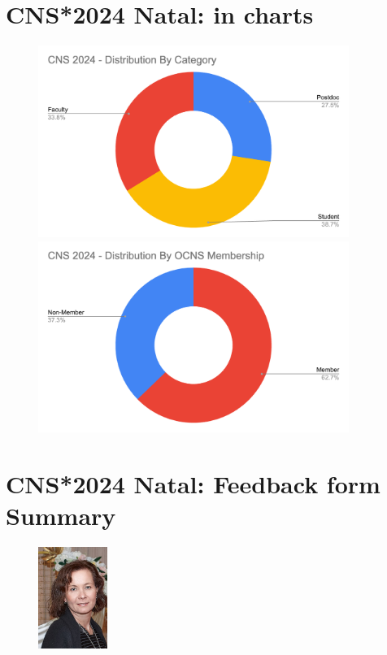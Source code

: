\documentclass[11pt,a4paper,oneside]{article}
\begin{document}
\clearpage
\section*{CNS*2024 Natal: in charts}%
\vspace{-4ex}
\sectionauthor{}
\begin{figure}[ht]
  \centering
  \includegraphics[width=0.9\textwidth]{images/cns2024-attendees-distribution-career-1}\\\vspace{3ex}
  \includegraphics[width=0.9\textwidth]{images/cns2024-attendees-distribution-membership-1}\\
\end{figure}

\clearpage


\clearpage
\section*{CNS*2024 Natal: Feedback form Summary}%
\begin{figure}
  \includegraphics[width=0.2\textwidth]{images/Kameneva}
\end{figure}
\end{document}

